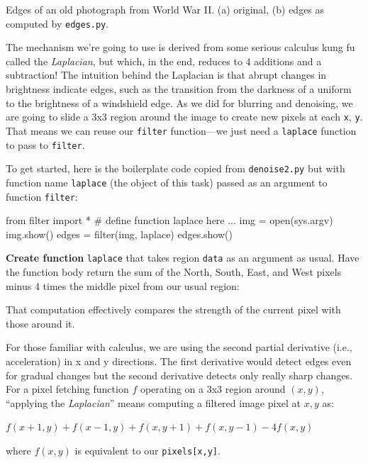 \begin{marginfigure}
\begin{center}
\end{center}
\caption{Edges of an old photograph from World War II.  (a) original, (b) edges as computed by {\tt edges.py}.}
\label{jeepedges}
\end{marginfigure}

The mechanism we're going to use is derived from some serious calculus kung fu called the {\em Laplacian}, but which, in the end, reduces to 4 additions and a subtraction!  The intuition behind the Laplacian is that abrupt changes in brightness indicate edges, such as the transition from the darkness of a uniform to the brightness of a windshield edge.  As we did for blurring and denoising, we are going to slide a 3x3 region around the image to create new pixels at each {\tt x}, {\tt y}. That  means we can reuse our {\tt filter} function---we just need a {\tt laplace} function to pass to {\tt filter}.

To get started, here is the boilerplate code copied from {\tt denoise2.py} but with function name {\tt laplace} (the object of this task) passed as an argument to function {\tt filter}:

\begin{pyverbatim}
from filter import *
# define function laplace here
...
img = open(sys.argv)
img.show()
edges = filter(img, laplace)
edges.show()
\end{pyverbatim}

{\bf Create function} {\tt laplace} that takes region {\tt data} as an argument as usual. Have the function body  return the sum of the North, South, East, and West pixels minus 4 times the middle pixel from our usual region:

\begin{center}
\end{center}

\noindent That computation effectively compares the strength of the current pixel with those around it.

\begin{callout}{\bcinfo}
For those familiar with calculus, we are using the second partial derivative (i.e., acceleration) in x and y directions. The first derivative would detect edges even for gradual changes but the second derivative detects only really sharp changes. For a pixel fetching function $f$ operating on a 3x3 region around $(x,y)$, ``applying the {\em Laplacian}'' means computing a filtered image pixel at $x,y$ as:

{\footnotesize $f(x + 1,y) + f(x - 1,y) + f(x,y + 1) + f(x,y - 1) - 4f(x, y)$}

where $f(x,y)$ is equivalent to our {\tt pixels[x,y]}.
\end{callout}

